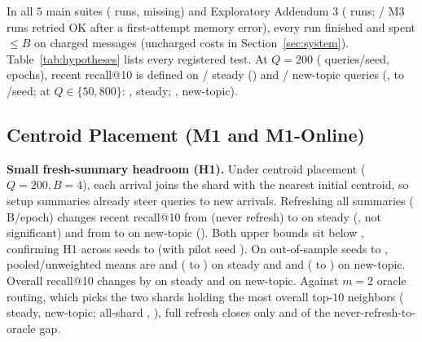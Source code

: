 In all $5$ main suites (\RNumTotalMainRuns{} runs, \RNumMissingRuns{} missing) and Exploratory Addendum 3 (\RNumAddThreeTotalRuns{} runs; \RNumAddThreeMThreeFailedAttempts{}/\RNumAddThreeMThreeRuns{} M3 runs retried OK after a first-attempt memory error), every run finished and spent $\le B$ on charged messages (uncharged costs in Section~\ref{sec:system}). Table~\ref{tab:hypotheses} lists every registered test. At $Q{=}200$ (\RNumQueriesPerSeedQTwoHundred{} queries/seed, \RNumNumEpochs{} epochs), recent recall@10 is defined on \RNumQueriesWithRecentSteadyQTwoHundred{}/\RNumQueriesTotalQTwoHundred{} steady (\RNumQueriesWithRecentFracSteadyQTwoHundred{}) and \RNumQueriesWithRecentNewTopicQTwoHundred{}/\RNumQueriesTotalQTwoHundred{} new-topic queries (\RNumQueriesWithRecentFracNewTopicQTwoHundred{}, \RNumNewTopicValidQueriesSeedMinQTwoHundred{} to \RNumNewTopicValidQueriesSeedMaxQTwoHundred{}/seed; at $Q \in \{50, 800\}$: \RNumQueriesWithRecentSteadyQFifty{}, \RNumQueriesWithRecentSteadyQEightHundred{} steady; \RNumQueriesWithRecentNewTopicQFifty{}, \RNumQueriesWithRecentNewTopicQEightHundred{} new-topic).

\subsection{Centroid Placement (M1 and M1-Online)}
\label{sec:results_m1}

\textbf{Small fresh-summary headroom (H1).} Under centroid placement ($Q = 200, B = 4$), each arrival joins the shard with the nearest initial centroid, so setup summaries already steer queries to new arrivals. Refreshing all \RNumNumShards{} summaries (\RNumAlwaysFreshEpochBytes{} B/epoch) changes recent recall@10 from \RNumMOneNRRecentSteady{} (never refresh) to \RNumMOneAFRecentSteady{} on steady (\RNumHOneGapSteady{}, not significant) and from \RNumMOneNRRecentNewTopic{} to \RNumMOneAFRecentNewTopic{} on new-topic (\RNumHOneGapNewTopic{}). Both upper \RNumCIPct{} bounds sit below \RNumGateThresholdPP{}, confirming H1 across seeds \RNumSeedMin{} to \RNumSeedMax{} (with pilot seed \RNumPilotSeed{}). On out-of-sample seeds \RNumOutOfSampleSeedMin{} to \RNumSeedMax{}, pooled/unweighted means are \RNumHOneOutOfSampleMeanSteady{} and \RNumHOneOutOfSampleUnweightedMeanSteady{} (\RNumHOneOutOfSampleMinSteady{} to \RNumHOneOutOfSampleMaxSteady{}) on steady and \RNumHOneOutOfSampleMeanNewTopic{} and \RNumHOneOutOfSampleUnweightedMeanNewTopic{} (\RNumHOneOutOfSampleMinNewTopic{} to \RNumHOneOutOfSampleMaxNewTopic{}) on new-topic. Overall recall@10 changes by \RNumHOneOverallGapSteady{} on steady and \RNumHOneOverallGapNewTopic{} on new-topic. Against $m{=}2$ oracle routing, which picks the two shards holding the most overall top-$10$ neighbors (\RNumMOneOracleRecentSteady{} steady, \RNumMOneOracleRecentNewTopic{} new-topic; all-shard \RNumMOneAllShardsRecentSteady{}, \RNumMOneAllShardsRecentNewTopic{}), full refresh closes only \RNumMOneAFShareOfOracleSteady{} and \RNumMOneAFShareOfOracleNewTopic{} of the never-refresh-to-oracle gap.

